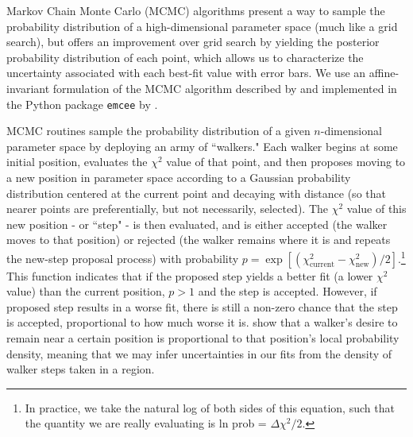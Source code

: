 Markov Chain Monte Carlo (MCMC) algorithms present a way to sample the probability distribution of a high-dimensional parameter space (much like a grid search), but offers an improvement over grid search by yielding the posterior probability distribution of each point, which allows us to characterize the uncertainty associated with each best-fit value with error bars. We use an affine-invariant formulation of the MCMC algorithm described by \citet{Goodman2010} and implemented in the Python package \texttt{emcee} by \citet{ForemanMackey2013}.

MCMC routines sample the probability distribution of a given $n$-dimensional parameter space by deploying an army of ``walkers." Each walker begins at some initial position, evaluates the $\chi^2$ value of that point, and then proposes moving to a new position in parameter space according to a Gaussian probability distribution centered at the current point and decaying with distance (so that nearer points are preferentially, but not necessarily, selected). The $\chi^2$ value of this new position - or ``step" - is then evaluated, and is either accepted (the walker moves to that position) or rejected (the walker remains where it is and repeats the new-step proposal process) with probability $p = \exp \left[ (\chi_\text{current}^2 - \chi_\text{new}^2)/2 \right]$.\footnote{In practice, we take the natural log of both sides of this equation, such that the quantity we are really evaluating is ln prob = $\Delta \chi^2/2$.} This function indicates that if the proposed step yields a better fit (a lower $\chi^2$ value) than the current position, $p > 1$ and the step is accepted. However, if proposed step results in a worse fit, there is still a non-zero chance that the step is accepted, proportional to how much worse it is. \citet{Goodman2010} show that a walker's desire to remain near a certain position is proportional to that position's local probability density, meaning that we may infer uncertainties in our fits from the density of walker steps taken in a region.


